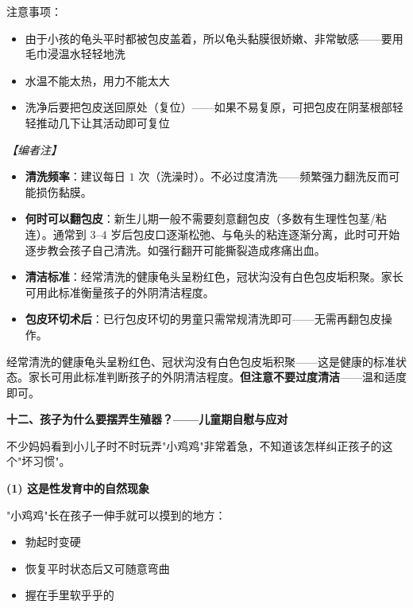 注意事项：
\begin{itemize}
	\item 由于小孩的龟头平时都被包皮盖着，所以龟头黏膜很娇嫩、非常敏感——要用毛巾浸温水轻轻地洗
	\item 水温不能太热，用力不能太大
	\item 洗净后要把包皮送回原处（复位）——如果不易复原，可把包皮在阴茎根部轻轻推动几下让其活动即可复位
\end{itemize}

\vspace{0.3em}
\noindent\textit{【编者注】}
\begin{itemize}
	\item \textbf{清洗频率}：建议每日 $1$ 次（洗澡时）。不必过度清洗——频繁强力翻洗反而可能损伤黏膜。
	\item \textbf{何时可以翻包皮}：新生儿期一般不需要刻意翻包皮（多数有生理性包茎/粘连）。通常到 $3$--$4$ 岁后包皮口逐渐松弛、与龟头的粘连逐渐分离，此时可开始逐步教会孩子自己清洗。如强行翻开可能撕裂造成疼痛出血。
	\item \textbf{清洁标准}：经常清洗的健康龟头呈粉红色，冠状沟没有白色包皮垢积聚。家长可用此标准衡量孩子的外阴清洁程度。
	\item \textbf{包皮环切术后}：已行包皮环切的男童只需常规清洗即可——无需再翻包皮操作。
\end{itemize}

\begin{tcolorbox}[colback=pink!5!white,colframe=red!50!black,title=贴心小叮咛]
经常清洗的健康龟头呈粉红色、冠状沟没有白色包皮垢积聚——这是健康的标准状态。家长可用此标准判断孩子的外阴清洁程度。\textbf{但注意不要过度清洁}——温和适度即可。
\end{tcolorbox}

\vspace{0.8em}
\noindent\textbf{十二、孩子为什么要摆弄生殖器？——儿童期自慰与应对}

不少妈妈看到小儿子时不时玩弄"小鸡鸡"非常着急，不知道该怎样纠正孩子的这个"坏习惯"。

\vspace{0.3em}
\noindent\textbf{(1) 这是性发育中的自然现象}

"小鸡鸡"长在孩子一伸手就可以摸到的地方：
\begin{itemize}
	\item 勃起时变硬
	\item 恢复平时状态后又可随意弯曲
	\item 握在手里软乎乎的
\end{itemize}

